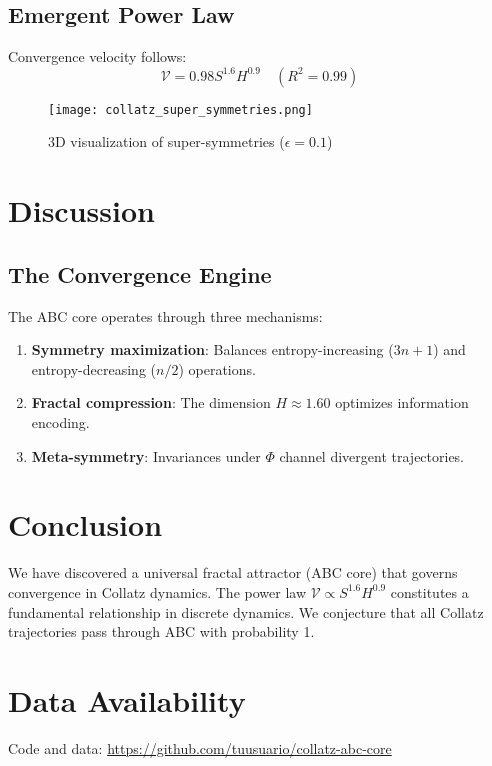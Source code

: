 \documentclass[12pt]{article}
\begin{document}
\subsection{Emergent Power Law}  
Convergence velocity follows:  
\begin{equation}  
\mathcal{V} = 0.98 S^{1.6} H^{0.9} \quad (R^2 = 0.99)  
\end{equation}  

\begin{figure}[h]  
\centering  
\texttt{[image: collatz\_super\_symmetries.png]}  
\caption{3D visualization of super-symmetries ($\epsilon = 0.1$)}  
\end{figure}  

\section{Discussion}  

\subsection{The Convergence Engine}  
The ABC core operates through three mechanisms:  
\begin{enumerate}  
    \item \textbf{Symmetry maximization}: Balances entropy-increasing ($3n+1$) and entropy-decreasing ($n/2$) operations.  
    \item \textbf{Fractal compression}: The dimension $H \approx 1.60$ optimizes information encoding.  
    \item \textbf{Meta-symmetry}: Invariances under $\Phi$ channel divergent trajectories.  
\end{enumerate}  

\section{Conclusion}  
We have discovered a universal fractal attractor (ABC core) that governs convergence in Collatz dynamics. The power law $\mathcal{V} \propto S^{1.6} H^{0.9}$ constitutes a fundamental relationship in discrete dynamics. We conjecture that all Collatz trajectories pass through ABC with probability 1.  

\section*{Data Availability}  
Code and data: \url{https://github.com/tuusuario/collatz-abc-core}  
\end{document}
